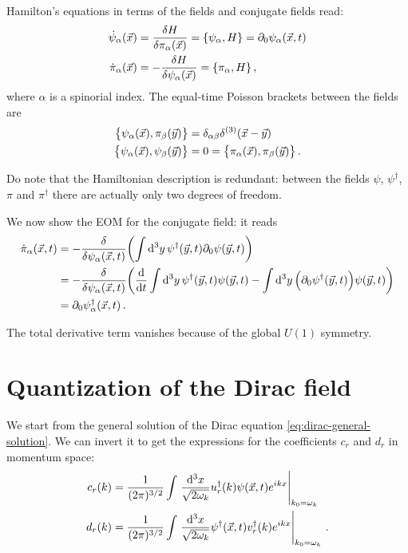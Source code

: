 \documentclass[main.tex]{subfiles}
\begin{document}
Hamilton's equations in terms of the fields and conjugate fields read: 
%
\begin{align}
\dot{\psi}_{\alpha } (\vec{x}) &= \fdv{H}{\pi_{\alpha }(\vec{x})} = \qty{\psi_{\alpha }, H} = \partial_0 \psi_{\alpha } (\vec{x}, t)\\
\dot{\pi }_{\alpha } (\vec{x}) &= - \fdv{H}{\psi _{\alpha }(\vec{x})} = \qty{\pi_{\alpha }, H} 
\,,
\end{align}
%
where \(\alpha \) is a spinorial index. 
The equal-time Poisson brackets between the fields are 
%
\begin{align}
\qty{\psi_{\alpha } (\vec{x}), \pi_{\beta } (\vec{y})} &= \delta_{\alpha \beta } \delta^{(3)} (\vec{x}-\vec{y})  \\
\qty{\psi_{\alpha }(\vec{x}), \psi_{\beta }(\vec{y})} 
&= 0 = 
\qty{\pi_{\alpha }(\vec{x}), \pi_{\beta }(\vec{y})} 
\,.
\end{align}

Do note that the Hamiltonian description is redundant: between the fields \(\psi \), \(\psi ^\dag\), \(\pi \) and \(\pi ^\dag\) there are actually only two degrees of freedom. 

We now show the EOM for the conjugate field: it reads 
%
\begin{align}
\dot{\pi}_{\alpha } (\vec{x}, t)
&= - \fdv{}{\psi_{\alpha }(\vec{x}, t)}
\qty(\int \dd[3]{y} \psi ^\dag(\vec{y}, t) \partial_0 \psi (\vec{y}, t))  \\
&= - \fdv{}{\psi_{\alpha }(\vec{x}, t)}
\qty(\dv{}{t} \int \dd[3]{y} \psi ^\dag(\vec{y}, t) \psi (\vec{y}, t)
- \int \dd[3]{y} \qty(\partial_0 \psi ^\dag (\vec{y},t) ) \psi (\vec{y}, t)
)  \\
&= \partial_0 \psi ^\dag_{\alpha } (\vec{x}, t)
\,.
\end{align}

The total derivative term vanishes because of the global \(U(1)\) symmetry. 

\section{Quantization of the Dirac field}


We start from the general solution of the Dirac equation \eqref{eq:dirac-general-solution}. We can invert it to get the expressions for the coefficients \(c_r\) and \(d_r\) in momentum space: 
%
\begin{align}
c_r (k) &= \frac{1}{(2\pi )^{3/2}} \int \eval{\frac{ \dd[3]{x}}{\sqrt{2 \omega_{k}}} 
u_{r} ^\dag (k) \psi (\vec{x}, t) e^{ikx}}_{k_0 = \omega_{k}}  \\
d_r (k) &= \frac{1}{(2\pi )^{3/2}} \int \eval{\frac{ \dd[3]{x}}{\sqrt{2 \omega_{k}}} 
\psi ^\dag (\vec{x}, t) v_{r} ^\dag (k)  e^{ikx}}_{k_0 = \omega_{k}}
\,.
\end{align}
\end{document}
